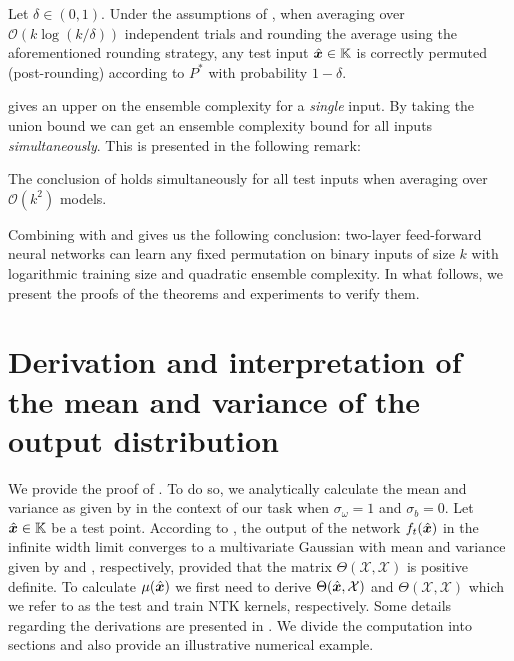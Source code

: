 \begin{theorem}
\label{thm:ensemble}
Let $\delta \in (0,1)$. Under the assumptions of , when averaging over $\mathcal{O}(k \log \left(k/\delta\right))$ independent trials and rounding the average using the aforementioned rounding strategy, any test input $\hat{\boldsymbol{x}} \in \mathbb{K}$ is correctly permuted (post-rounding) according to $P^*$ with probability $1-\delta$. 
\end{theorem}

 gives an upper on the ensemble complexity for a \emph{single} input. By taking the union bound we can get an ensemble complexity bound for all inputs \emph{simultaneously}. This is presented in the following remark:

\begin{remark}
    \label{rem:simult}
    The conclusion of  holds simultaneously for all test inputs when averaging over $\mathcal{O}(k^2)$ models. 
\end{remark}

Combining  with   and  gives us the following conclusion: two-layer feed-forward neural networks can learn any fixed permutation on binary inputs of size $k$ with logarithmic training size and quadratic ensemble complexity. In what follows, we present the proofs of the theorems and experiments to verify them. 


\section{Derivation and interpretation of the mean and variance of the output distribution}
\label{sec:mean_var}
We provide the proof of . To do so, we analytically calculate the mean and variance as given by  in the context of our task when $\sigma_\omega = 1$ and $\sigma_b = 0$. Let $\hat{\boldsymbol{x}} \in \mathbb{K}$ be a test point. According to , the output of the network $f_t(\hat{\boldsymbol{x}})$ in the infinite width limit converges to a multivariate Gaussian with mean and variance given by  and , respectively, 
provided that the matrix $\Theta(\mathcal{X}, \mathcal{X})$ is positive definite.
To calculate $\mu(\hat{\boldsymbol{x}})$ we first need to derive $\Theta(\hat{\boldsymbol{x}},\mathcal{X})$ and $\Theta(\mathcal{X}, \mathcal{X})$ which we refer to as the test and train NTK kernels, respectively. Some details regarding the derivations are presented in . We divide the computation into sections and also provide an illustrative numerical example.

